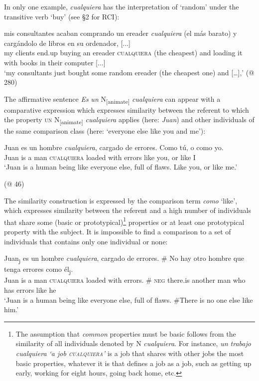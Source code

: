 {In only one example, \textit{cualquiera} has the interpretation of ‘random’ under the transitive verb ‘buy’ (see §2 for RCI):}

\ea \label{ex:key:mis} %
    \gll mis consultantes acaban comprando un ereader \textit{cualquiera} (el {más barato)} y cargándolo de libros en su ordenador, [...]\\
    my clients end.up buying an ereader \textsc{cualquiera} (the {cheapest)} and {loading it} with books in their computer [...]\\
    \glt ‘my consultants just bought some random ereader (the cheapest one) and […],' (@ 280)
\z

The affirmative sentence \textit{Es} \textit{un} N\textsubscript{[animate]} \textit{cualquiera} can appear with a comparative expression which expresses similarity between the referent to which the property \textsc{un} N\textsubscript{[animate]} \textit{cualquiera} applies (here: \textit{Juan}) and other individuals of the same comparison class (here: ‘everyone else like you and me’):

\ea \label{ex:key:128} %
\gll Juan es un hombre \textit{cualquiera}, cargado de errores. Como tú, o como yo.\\
Juan is a man \textsc{cualquiera} loaded with errors like you, or like I\\
\glt ‘Juan is a human being like everyone else, full of flaws. Like you, or like me.’

  (@ 46)
\z

The similarity construction is expressed by the comparison term \textit{como} ‘like’, which expresses similarity between the referent and a high number of individuals that share some (basic or prototypical)\footnote{{The assumption that} {\textit{common}} {properties must be basic follows from the similarity of all individuals denoted by N} {\textit{cualquiera}}{. For instance,} {\textit{un trabajo cualquiera ‘a job \textsc{cualquiera}’}} {is a job that shares with other jobs the most basic properties, whatever it is that defines a job as a job, such as getting up early, working for eight hours, going back home, etc.}} properties or at least one prototypical property with the subject. It is impossible to find a comparison to a set of individuals that contains only one individual or none:

\ea \label{ex:key:129} %
\gll Juan\textsubscript{j} es un hombre \textit{cualquiera}, cargado de errores. \# No hay otro hombre que tenga errores como él\textsubscript{j}.\\
Juan is a man \textsc{cualquiera} loaded with errors. \# \textsc{neg} there.is another man who has errors like he\\
\glt ‘Juan is a human being like everyone else, full of flaws. \#There is no one else like him.’
\z

